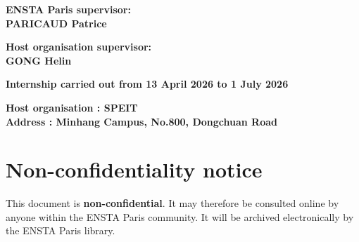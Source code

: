 \documentclass[12pt,a4paper]{report}
\newcommand{\hostOrganisation}{SPEIT}
\newcommand{\hostAddress}{Minhang Campus, No.800, Dongchuan Road}
\newcommand{\enstaSupervisor}{PARICAUD Patrice}
\newcommand{\hostSupervisor}{GONG Helin}
\newcommand{\dateFrom}{13 April 2026}
\newcommand{\dateTo}{1 July 2026}
\begin{document}
\begin{titlepage}
\begin{center}
\vspace{0.8cm}

\noindent
\begin{minipage}[t]{0.48\textwidth}
  \raggedright\bfseries ENSTA Paris supervisor:\\ \enstaSupervisor
\end{minipage}
\hfill
\begin{minipage}[t]{0.48\textwidth}
  \raggedleft\bfseries Host organisation supervisor:\\ \hostSupervisor
\end{minipage}

\vspace{0.9cm}

{\bfseries Internship carried out from \dateFrom{} to \dateTo\par}

\vspace{0.5cm}

\noindent\begin{minipage}{\textwidth}\centering\bfseries
  Host organisation : \hostOrganisation\\
  Address : \hostAddress
\end{minipage}

\end{center}
\end{titlepage}

\thispagestyle{empty}
\mbox{}
\clearpage

\thispagestyle{empty}
\chapter*{Non-confidentiality notice}

\vspace{1cm}

\noindent This document is \textbf{non-confidential}. It may therefore be
consulted online by anyone within the ENSTA Paris community. It will be
archived electronically by the ENSTA Paris library.

\vspace{1.5cm}
\end{document}
